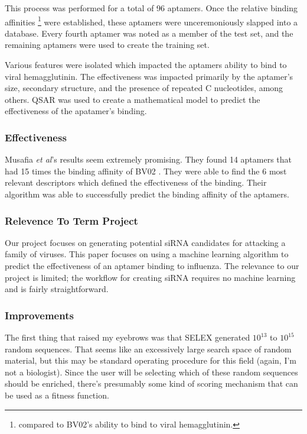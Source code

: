 \documentclass[10pt,a4paper]{article}
\begin{document}
	
	This process was performed for a total of 96 aptamers. 
	Once the relative binding affinities \footnote{compared to BV02's ability to bind to viral hemagglutinin.} were established, these aptamers were unceremoniously slapped into a database.
	Every fourth aptamer was noted as a member of the test set, and the remaining aptamers were used to create the training set.
	
	Various features were isolated which impacted the aptamers ability to bind to viral hemagglutinin.
	The effectiveness was impacted primarily by the aptamer's size, secondary structure, and the presence of repeated C nucleotides, among others.
	QSAR was used to create a mathematical model to predict the effectiveness of the apatamer's binding.
	
	\subsubsection*{Effectiveness}
	Musafia \textit{et al}'s results seem extremely promising.
	They found 14 aptamers that had 15 times the binding affinity of BV02 	 \cite{musafia2014designing}.
	They  were able to find the 6 most relevant descriptors which defined the effectiveness of the binding.
	Their algorithm was able to successfully predict the binding affinity of the aptamers.

	\subsubsection*{Relevence To Term Project}  
	Our project focuses on generating potential siRNA candidates for attacking a family of viruses.
	This  paper focuses on  using a machine learning algorithm to predict the effectiveness of an aptamer binding to influenza.
	The relevance to our project is limited; the workflow for creating siRNA requires no machine learning and is fairly straightforward. 
	\subsubsection*{Improvements}
	The first thing that raised my eyebrows  was that SELEX generated $ 10^{13 }$  to $ 10^{15} $ random sequences.
	That seems like an excessively large search space of random material, but this may be standard operating procedure for this field (again, I'm not a biologist).
	Since the user will be selecting which of these random sequences should be enriched, there's presumably some kind of scoring mechanism that can be used as a fitness function.
	
\end{document}
